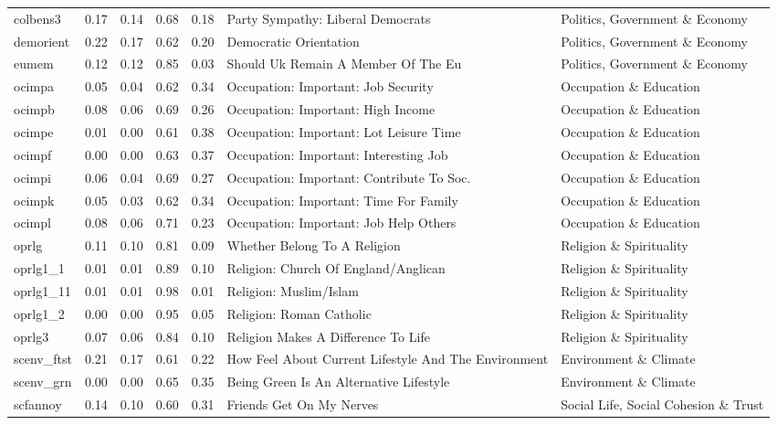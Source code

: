 \begin{longtable}{l|rrrrll}
colbens3 & 0.17 & 0.14 & 0.68 & 0.18 & Party Sympathy: Liberal Democrats & Politics, Government \& Economy \\ 
demorient & 0.22 & 0.17 & 0.62 & 0.20 & Democratic Orientation & Politics, Government \& Economy \\ 
eumem & 0.12 & 0.12 & 0.85 & 0.03 & Should Uk Remain A Member Of The Eu & Politics, Government \& Economy \\ 
ocimpa & 0.05 & 0.04 & 0.62 & 0.34 & Occupation: Important: Job Security & Occupation \& Education \\ 
ocimpb & 0.08 & 0.06 & 0.69 & 0.26 & Occupation: Important: High Income & Occupation \& Education \\ 
ocimpe & 0.01 & 0.00 & 0.61 & 0.38 & Occupation: Important: Lot Leisure Time & Occupation \& Education \\ 
ocimpf & 0.00 & 0.00 & 0.63 & 0.37 & Occupation: Important: Interesting Job & Occupation \& Education \\ 
ocimpi & 0.06 & 0.04 & 0.69 & 0.27 & Occupation: Important: Contribute To Soc. & Occupation \& Education \\ 
ocimpk & 0.05 & 0.03 & 0.62 & 0.34 & Occupation: Important: Time For Family & Occupation \& Education \\ 
ocimpl & 0.08 & 0.06 & 0.71 & 0.23 & Occupation: Important: Job Help Others & Occupation \& Education \\ 
oprlg & 0.11 & 0.10 & 0.81 & 0.09 & Whether Belong To A Religion & Religion \& Spirituality \\ 
oprlg1\_1 & 0.01 & 0.01 & 0.89 & 0.10 & Religion: Church Of England/Anglican & Religion \& Spirituality \\ 
oprlg1\_11 & 0.01 & 0.01 & 0.98 & 0.01 & Religion: Muslim/Islam & Religion \& Spirituality \\ 
oprlg1\_2 & 0.00 & 0.00 & 0.95 & 0.05 & Religion: Roman Catholic & Religion \& Spirituality \\ 
oprlg3 & 0.07 & 0.06 & 0.84 & 0.10 & Religion Makes A Difference To Life & Religion \& Spirituality \\ 
scenv\_ftst & 0.21 & 0.17 & 0.61 & 0.22 & How Feel About Current Lifestyle And The Environment & Environment \& Climate \\ 
scenv\_grn & 0.00 & 0.00 & 0.65 & 0.35 & Being Green Is An Alternative Lifestyle & Environment \& Climate \\ 
scfannoy & 0.14 & 0.10 & 0.60 & 0.31 & Friends Get On My Nerves & Social Life, Social Cohesion \& Trust \\ 

\end{longtable}

